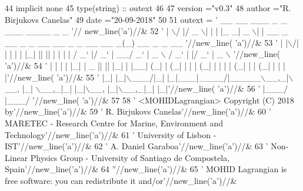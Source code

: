 \begin{DoxyCode}
44     \textcolor{keywordtype}{implicit none}
45     \textcolor{keywordtype}{type}(string) :: outext
46 
47     version  =\textcolor{stringliteral}{"v0.3"}
48     author   =\textcolor{stringliteral}{"R. Birjukovs Canelas"}
49     date     =\textcolor{stringliteral}{"20-09-2018"}
50 
51     outext = \textcolor{stringliteral}{' \_\_  \_\_  \_\_\_  \_   \_ \_\_\_ \_\_\_\_  \_                                      \_              '}//
      new\_line(\textcolor{stringliteral}{'a'})//&
52         \textcolor{stringliteral}{' |  \(\backslash\)/  |/ \_ \(\backslash\)| | | |\_ \_|  \_ \(\backslash\)| |    \_\_ \_  \_\_ \_ \_ \_\_ \_\_ \_ \_ \_\_   \_\_ \_(\_) \_\_ \_ \_ \_\_  '}//new\_line(\textcolor{stringliteral}{
      'a'})//&
53         \textcolor{stringliteral}{' | |\(\backslash\)/| | | | | |\_| || || | | | |   / \_` |/ \_` | \_\_/  \_` |  \_ \(\backslash\) / \_` | |/ \_` |  \_ \(\backslash\) '}//new\_line(\textcolor{stringliteral}{
      'a'})//&
54         \textcolor{stringliteral}{' | |  | | |\_| |  \_  || || |\_| | |\_\_| (\_| | (\_| | | | (\_| | | | | (\_| | | (\_| | | | |'}//new\_line(\textcolor{stringliteral}{
      'a'})//&
55         \textcolor{stringliteral}{' |\_|  |\_|\(\backslash\)\_\_\_/|\_| |\_|\_\_\_|\_\_\_\_/|\_\_\_\_\_\(\backslash\)\_\_,\_|\(\backslash\)\_\_, |\_|  \(\backslash\)\_\_,\_|\_| |\_|\(\backslash\)\_\_, |\_|\(\backslash\)\_\_,\_|\_| |\_|'}//new\_line(\textcolor{stringliteral}{
      'a'})//&
56         \textcolor{stringliteral}{'                                          |\_\_\_/                 |\_\_\_/               '}//new\_line(\textcolor{stringliteral}{
      'a'})//&
57 
58         \textcolor{stringliteral}{'  <MOHIDLagrangian> Copyright (C) 2018 by'}//new\_line(\textcolor{stringliteral}{'a'})//&
59         \textcolor{stringliteral}{'  R. Birjukovs Canelas'}//new\_line(\textcolor{stringliteral}{'a'})//&
60         \textcolor{stringliteral}{'  MARETEC - Research Centre for Marine, Environment and Technology'}//new\_line(\textcolor{stringliteral}{'a'})//&
61         \textcolor{stringliteral}{'  University of Lisbon - IST'}//new\_line(\textcolor{stringliteral}{'a'})//&
62         \textcolor{stringliteral}{'  A. Daniel Garaboa'}//new\_line(\textcolor{stringliteral}{'a'})//&
63         \textcolor{stringliteral}{'  Non-Linear Physics Group - University of Santiago de Compostela, Spain'}//new\_line(\textcolor{stringliteral}{'a'})//&
64         \textcolor{stringliteral}{''}//new\_line(\textcolor{stringliteral}{'a'})//&
65         \textcolor{stringliteral}{'  MOHID Lagrangian is free software: you can redistribute it and/or'}//new\_line(\textcolor{stringliteral}{'a'})//&

\end{DoxyCode}
